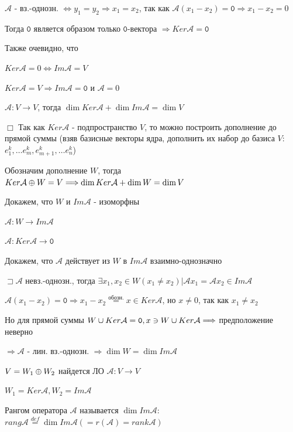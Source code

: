 \documentclass[12pt]{article}
\begin{document}
    $\mathcal{A}$ - вз.-однозн. $\Longleftrightarrow y_1 = y_2 \Longrightarrow x_1 = x_2$, так как $\mathcal{A}(x_1 - x_2) = \texttt{0} \Longrightarrow x_1 - x_2 = 0$

    Тогда $\texttt{0}$ является образом только $\texttt{0}$-вектора $\Longrightarrow Ker \mathcal{A} = \texttt{0}$

    \Nota Также очевидно, что

    $Ker \mathcal{A} = 0 \Longleftrightarrow Im \mathcal{A} = V$

    $Ker \mathcal{A} = V \Longrightarrow Im \mathcal{A} = \texttt{0}$ и $\mathcal{A} = 0$

    \Th $\mathcal{A} : V \rightarrow V$, тогда $\dim Ker \mathcal{A} + \dim Im \mathcal{A} = \dim V$

    $\Box$ Так как $Ker \mathcal{A}$ - подпространство $V$, то можно построить дополнение до прямой суммы (взяв базисные векторы ядра, дополнить их набор до базиса $V$: $e^k_1, \dots e^k_m, e^k_{m+1}, \dots e^k_n$)

    Обозначим дополнение $W$, тогда $Ker \mathcal{A} \oplus W = V \Longrightarrow \dim Ker \mathcal{A} + \dim W = \dim V$

    Докажем, что $W$ и $Im \mathcal{A}$ - изоморфны

    $\mathcal{A} : W \rightarrow Im \mathcal{A}$

    $\mathcal{A} : Ker \mathcal{A} \rightarrow \texttt{0}$

    Докажем, что $\mathcal{A}$ действует из $W$ в $Im \mathcal{A}$ взаимно-однозначно

    $\sqsupset \mathcal{A}$ невз.-однозн., тогда $\exists x_1, x_2 \in W (x_1 \neq x_2) | \mathcal{A}x_1 = \mathcal{A}x_2 \in Im \mathcal{A}$

    $\mathcal{A}(x_1 - x_2) = \texttt{0} \Longrightarrow x_1 - x_2 \stackrel{\text{обозн.}}{=} x \in Ker \mathcal{A}$, но $x \neq 0$, так как $x_1 \neq x_2$

    Но для прямой суммы $W \cup Ker \mathcal{A} = \texttt{0}, x \ni W \cup Ker \mathcal{A} \Longrightarrow$ предположение неверно

    $\Longrightarrow \mathcal{A}$ - лин. вз.-однозн. $\Longrightarrow \dim W = \dim Im \mathcal{A}$

    $V = W_1 \oplus W_2$ найдется ЛО $\mathcal{A} : V \rightarrow V$

    $W_1 = Ker \mathcal{A}, W_2 = Im \mathcal{A}$

    \Def Рангом оператора $\mathcal{A}$ называется $\dim Im \mathcal{A}$: $rang \mathcal{A} \stackrel{def}{=} \dim Im \mathcal{A} (= r(\mathcal{A}) = rank \mathcal{A})$
\end{document}
